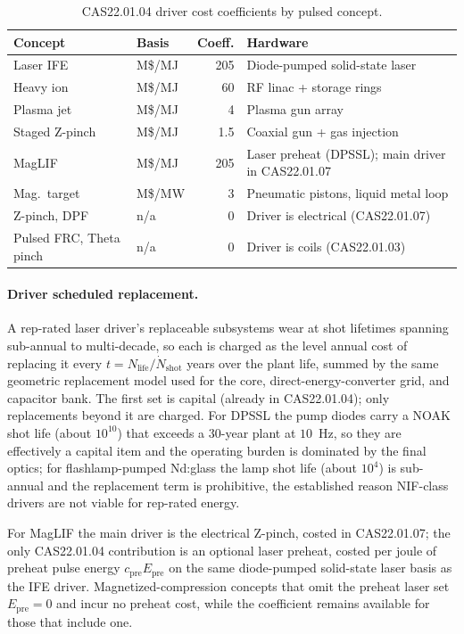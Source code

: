 \documentclass{article}
\begin{document}
\begin{table}[htbp]
\caption{CAS22.01.04 driver cost coefficients by pulsed concept.}
\label{tab:cas2204-driver}
\centering
\begin{tabular}{llrl}
\toprule
Concept & Basis & Coeff. & Hardware \\
\midrule
Laser IFE   & M\$/MJ & 205 & Diode-pumped solid-state laser \\
Heavy ion   & M\$/MJ & 60 & RF linac + storage rings \\
Plasma jet  & M\$/MJ &  4 & Plasma gun array \\
Staged Z-pinch & M\$/MJ & 1.5 & Coaxial gun + gas injection \\
MagLIF      & M\$/MJ & 205 & Laser preheat (DPSSL); main driver in CAS22.01.07 \\
Mag.\ target & M\$/MW &  3 & Pneumatic pistons, liquid metal loop \\
\midrule
Z-pinch, DPF & n/a & 0 & Driver is electrical (CAS22.01.07) \\
Pulsed FRC, Theta pinch       & n/a & 0 & Driver is coils (CAS22.01.03) \\
\bottomrule
\end{tabular}
\end{table}

\paragraph{Driver scheduled replacement.}
A rep-rated laser driver's replaceable subsystems wear at shot lifetimes
spanning sub-annual to multi-decade, so each is charged as the level annual cost
of replacing it every $t = N_{\text{life}} / \dot N_{\text{shot}}$ years over the
plant life, summed by the same geometric replacement model used for the core,
direct-energy-converter grid, and capacitor bank. The first set is capital
(already in CAS22.01.04); only replacements beyond it are charged. For DPSSL the
pump diodes carry a NOAK shot life (about $10^{10}$) that exceeds a 30-year plant
at $10$~Hz, so they are effectively a capital item and the operating burden is
dominated by the final optics; for flashlamp-pumped Nd:glass the lamp shot life
(about $10^4$) is sub-annual and the replacement term is prohibitive, the
established reason NIF-class drivers are not viable for rep-rated energy.

For MagLIF the main driver is the electrical Z-pinch, costed in
CAS22.01.07; the only CAS22.01.04 contribution is an optional laser
preheat, costed per joule of preheat pulse energy
$c_{\text{pre}} E_{\text{pre}}$ on the same diode-pumped solid-state laser
basis as the IFE driver. Magnetized-compression concepts that omit the
preheat laser set $E_{\text{pre}} = 0$ and incur no preheat cost, while the
coefficient remains available for those that include one.
\end{document}
